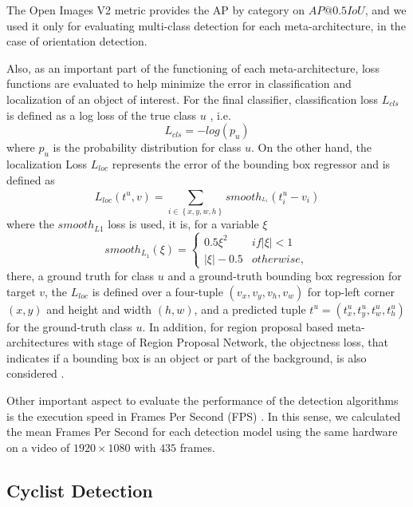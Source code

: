 \documentclass[journal]{IEEEtran}
\begin{document}
The Open Images V2 metric provides the AP by category on $AP@0.5IoU$, and we used it only for evaluating multi-class detection for each meta-architecture, in the case of orientation detection. 

Also, as an important part of the functioning of each meta-architecture, loss functions are evaluated to help minimize the error in classification and localization of an object of interest. For the final classifier, classification loss $L_{cls}$ is defined as a log loss of the true class $u$ \cite{girshick2015fast}, i.e. \begin{equation} L_{cls}=-log(p_u)\end{equation}
where $p_u$ is the probability distribution for class $u$. On the other hand, the localization Loss $L_{loc}$ represents the error of the bounding box regressor and is defined as
\begin{equation}
	L_{loc}\left ( t^{u}, v \right ) = \sum_{i \in \left \{ x,y,w,h \right \}}^{ } smooth_{^{L_{1}}} \left ( t^{u}_i - v_{i} \right )
    \label{loss_loc}
\end{equation} 
where the $smooth_{L1}$ loss is used, it is,  for a variable $\xi$
\begin{equation}
    smooth_{L_1} \left ( \xi \right ) = \begin{cases}
    0.5\xi^{2} & if\left | \xi \right | <  1\\ 
    \left | \xi \right | - 0.5 &  otherwise,
    \end{cases}
    \label{smoothL}
\end{equation}
there, a ground truth for class $u$ and a ground-truth bounding box regression for target $v$, the $L_{loc}$ is defined over a four-tuple $(v_x, v_y, v_h, v_w)$ for top-left corner $(x,y)$ and height and width $(h,w)$, and a predicted tuple $t^{u}=\left ( t_{x}^{u}, t_{y}^{u}, t_{w}^{u},t_{h}^{u}\right )$ for the ground-truth class $u$. In addition, for region proposal based meta-architectures with stage of Region Proposal Network, the objectness loss, that indicates if a bounding box is an object or part of the background, is also considered \cite{fasterObject2015}.

Other important aspect to evaluate the performance of the detection algorithms is the execution speed in Frames Per Second (FPS) \cite{liu2020deep}. In this sense, we calculated the mean Frames Per Second for each detection model using the same hardware on a video of $1920\times1080$ with $435$ frames.

\subsection{Cyclist Detection }
\label{sec:CyclistDetection}
\end{document}
